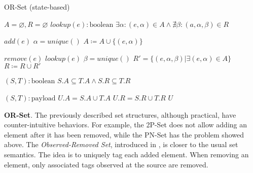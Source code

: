 \begin{algorithm}[t]
\small{
	\caption{OR-Set (state-based)}
 	\label{alg:or_set_state_based}                       

 	\begin{algorithmic}[1]
 	  \State \Payload $A = \varnothing, R = \varnothing$
 	  \State \Query $lookup(e) : \text{boolean}$
 	  \State \hspace{\algorithmicindent} \Return $\exists \alpha : (e, \alpha) \in A \land \nexists \beta : (a, \alpha, \beta) \in R$
 	  
 	  \State \Update $add(e)$
 	  \State \hspace{\algorithmicindent} \Let $\alpha = unique()$
 	  \State \hspace{\algorithmicindent} $A \coloneqq A \cup \{(e, \alpha)\}$
 	  
 	  \State \Update $remove(e)$
 	  \State \hspace{\algorithmicindent} \Pre $lookup(e)$
 	  \State \hspace{\algorithmicindent} \Let $\beta = unique()$
 	  \State \hspace{\algorithmicindent} \Let $R' = \{(e, \alpha, \beta) | \exists (e, \alpha) \in A\}$
 	  \State \hspace{\algorithmicindent} $R \coloneqq R \cup R'$
 	  
 	  \State \Compare $(S, T) : \text{boolean}$
 	  \State \hspace{\algorithmicindent} \Return $S.A \subseteq T.A \land S.R \subseteq T.R$ 
 	  
 	  \State \Merge $(S, T) : \text{payload}$
 	  \State \hspace{\algorithmicindent} \Let $U.A = S.A \cup T.A$
 	  \State \hspace{\algorithmicindent} \Let $U.R = S.R \cup T.R$
 	  \State \hspace{\algorithmicindent} \Return $U$
	\end{algorithmic}
 }
\end{algorithm}

\textbf{OR-Set}. The previously described set structures, although practical,
have counter-intuitive behaviors. For example, the 2P-Set does not allow adding
an element after it has been removed, while the PN-Set has the problem showed
above. The \textit{Observed-Removed Set}, introduced in
\cite{preguica:inria-00445758}, is closer to the usual set semantics. The idea
is to uniquely tag each added element. When removing an element, only associated
tags observed at the source are removed. 

